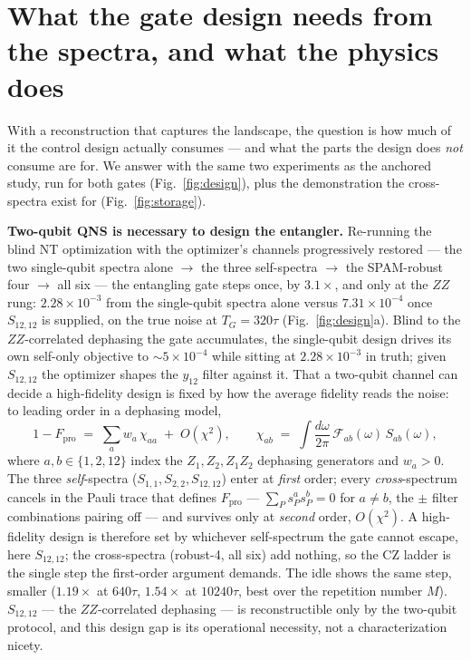 \documentclass[10pt]{article}
\newcommand{\TG}{T_G}
\begin{document}
\section{What the gate design needs from the spectra, and what the physics
does}\label{sec:design}

With a reconstruction that captures the landscape, the question is how much
of it the control design actually consumes --- and what the parts the design
does \emph{not} consume are for. We answer with the same two experiments as
the anchored study, run for both gates (Fig.~\ref{fig:design}), plus the
demonstration the cross-spectra exist for (Fig.~\ref{fig:storage}).

\textbf{Two-qubit QNS is necessary to design the entangler.} Re-running the
blind NT optimization with the optimizer's channels progressively restored
--- the two single-qubit spectra alone $\to$ the three self-spectra $\to$
the SPAM-robust four $\to$ all six --- the entangling gate steps once, by
$3.1\times$, and only at the $ZZ$ rung: $2.28\times10^{-3}$ from the
single-qubit spectra alone versus $7.31\times10^{-4}$ once $S_{12,12}$ is
supplied, on the true noise at $\TG = 320\tau$ (Fig.~\ref{fig:design}a).
Blind to the $ZZ$-correlated dephasing the gate accumulates, the
single-qubit design drives its own self-only objective to $\sim
5\times10^{-4}$ while sitting at $2.28\times10^{-3}$ in truth; given
$S_{12,12}$ the optimizer shapes the $y_{12}$ filter against it. That a
two-qubit channel can decide a high-fidelity design is fixed by how the
average fidelity reads the noise: to leading order in a dephasing model,
\begin{equation}
  1-F_\mathrm{pro} \;=\; \sum_{a} w_a\,\chi_{aa} \;+\; O(\chi^2),
  \qquad
  \chi_{ab} \;=\; \int\!\frac{d\omega}{2\pi}\,\mathcal{F}_{ab}(\omega)\,S_{ab}(\omega),
  \label{eq:budget}
\end{equation}
where $a,b\in\{1,2,12\}$ index the $Z_1, Z_2, Z_1Z_2$ dephasing generators
and $w_a>0$. The three \emph{self}-spectra ($S_{1,1}, S_{2,2}, S_{12,12}$)
enter at \emph{first} order; every \emph{cross}-spectrum cancels in the
Pauli trace that defines $F_\mathrm{pro}$ --- $\sum_P s_P^a s_P^b = 0$ for
$a\neq b$, the $\pm$ filter combinations pairing off --- and survives only
at \emph{second} order, $O(\chi^2)$. A high-fidelity design is therefore set
by whichever self-spectrum the gate cannot escape, here $S_{12,12}$; the
cross-spectra (robust-4, all six) add nothing, so the CZ ladder is the
single step the first-order argument demands. The idle shows the same step,
smaller ($1.19\times$ at $640\tau$, $1.54\times$ at $10240\tau$, best over
the repetition number $M$). $S_{12,12}$ --- the $ZZ$-correlated dephasing
--- is reconstructible only by the two-qubit protocol, and this design gap
is its operational necessity, not a characterization nicety.
\end{document}
